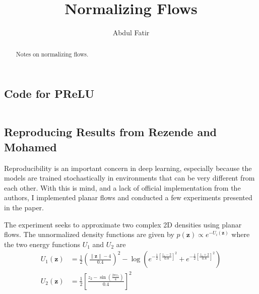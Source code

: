 \documentclass[]{article}
\title{Normalizing Flows}
\author{Abdul Fatir}
\date{}
\newenvironment{code}{\captionsetup{type=listing}}{}
\begin{document}
\maketitle

\begin{abstract}
Notes on normalizing flows.
\end{abstract}
\subsection{Code for PReLU}
\begin{code}
	\inputminted[linenos=true,frame=lines,framesep=2mm]{python}{prelu.py}
\end{code}
\subsection{Reproducing Results from Rezende and Mohamed}
Reproducibility is an important concern in deep learning, especially because the models are trained stochastically in environments that can be very different from each other.  With this is mind, and a lack of official implementation from the authors, I implemented planar flows and conducted a few experiments presented in the paper. 

The experiment seeks to approximate two complex 2D densities using planar flows. The unnormalized density functions are given by $p(\mathbf{z}) \propto e^{-U_i(\mathbf{z})}$ where the two energy functions $U_1$ and $U_2$ are
\begin{align}
U_1(\mathbf{z}) &= \frac{1}{2}\left(\frac{\|\mathbf{z}\| - 4}{0.4}\right)^2 - \log \left(e^{-\frac{1}{2}\left[\frac{z_1-2}{0.8}\right]^2} + e^{-\frac{1}{2}\left[\frac{z_1+2}{0.8}\right]^2} \right)\\
U_2(\mathbf{z}) &= \frac{1}{2}\left[\frac{z_2 - \sin\left(\frac{2\pi z_1}{4}\right)}{0.4}\right]^2
\end{align}
\end{document}
